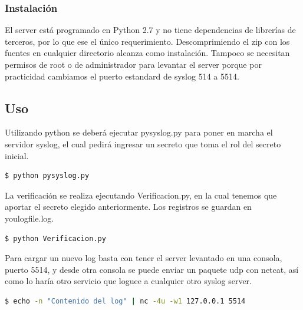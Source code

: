 \subsubsection{Instalación}
El server está programado en Python 2.7 y no tiene dependencias de librerías de terceros, por lo que ese el único requerimiento.
Descomprimiendo el zip con los fuentes en cualquier directorio alcanza como instalación.
Tampoco se necesitan permisos de root o de administrador para levantar el server porque por practicidad cambiamos el puerto estandard de syslog 514 a 5514.
\subsection{Uso}
Utilizando python se deberá ejecutar pysyslog.py para poner en marcha el servidor syslog, el cual pedirá ingresar un secreto que toma el rol del secreto inicial. 

\noindent
\begin{lstlisting}[language=bash,numbers=none]
  $ python pysyslog.py
\end{lstlisting}

La verificación se realiza ejecutando Verificacion.py, en la cual tenemos que aportar el secreto elegido anteriormente. Los registros se guardan en youlogfile.log. 

\noindent
\begin{lstlisting}[language=bash,numbers=none]
  $ python Verificacion.py
\end{lstlisting}

Para cargar un nuevo log basta con tener el server levantado en una consola, puerto 5514, y desde otra consola se puede enviar un paquete udp con netcat, así como lo haría otro servicio que loguee a cualquier otro syslog server.

\noindent
\begin{lstlisting}[language=bash,numbers=none]
  $ echo -n "Contenido del log" | nc -4u -w1 127.0.0.1 5514
\end{lstlisting}



